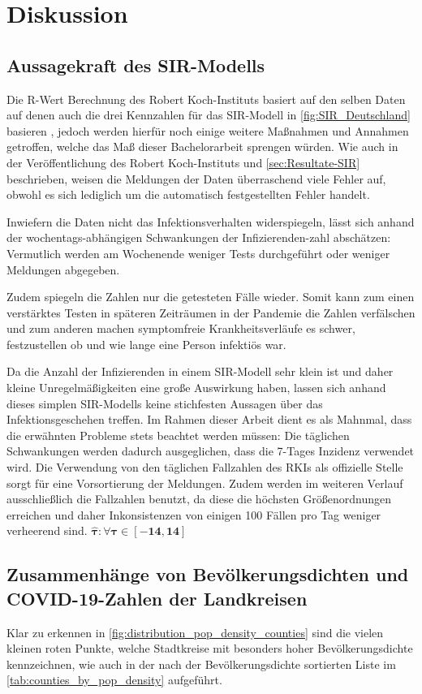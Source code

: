 \chapter{Diskussion}\label{chap:Diskussion}
\section{Aussagekraft des SIR-Modells}
Die R-Wert Berechnung des Robert Koch-Instituts basiert auf den selben Daten auf denen auch die drei Kennzahlen für das SIR-Modell in \autoref{fig:SIR_Deutschland} basieren \autocite{RKI_Bulletin}, jedoch werden hierfür noch einige weitere Maßnahmen und Annahmen getroffen, welche das Maß dieser Bachelorarbeit sprengen würden.\autocite{RKI_Bulletin}
Wie auch in der Veröffentlichung des Robert Koch-Instituts \autocite{RKI_Bulletin} und \autoref{sec:Resultate-SIR} beschrieben, weisen die Meldungen der Daten überraschend viele Fehler auf, obwohl es sich lediglich um die automatisch festgestellten Fehler handelt.

Inwiefern die Daten nicht das Infektionsverhalten widerspiegeln, lässt sich anhand der wochentags-abhängigen Schwankungen der Infizierenden-zahl abschätzen: Vermutlich werden am Wochenende weniger Tests durchgeführt oder weniger Meldungen abgegeben. 

Zudem spiegeln die Zahlen nur die getesteten Fälle wieder. Somit kann zum einen verstärktes Testen in späteren Zeiträumen in der Pandemie die Zahlen verfälschen und zum anderen machen symptomfreie Krankheitsverläufe es schwer, festzustellen ob und wie lange eine Person infektiös war.

Da die Anzahl der Infizierenden in einem SIR-Modell sehr klein ist und daher kleine Unregelmäßigkeiten eine große Auswirkung haben, lassen sich anhand dieses simplen SIR-Modells keine stichfesten Aussagen über das Infektionsgeschehen treffen.
Im Rahmen dieser Arbeit dient es als Mahnmal, dass die erwähnten Probleme stets beachtet werden müssen:
Die täglichen Schwankungen werden dadurch ausgeglichen, dass die 7-Tages Inzidenz verwendet wird. Die Verwendung von den täglichen Fallzahlen des RKIs als offizielle Stelle sorgt für eine Vorsortierung der Meldungen. Zudem werden im weiteren Verlauf ausschließlich die Fallzahlen benutzt, da diese die höchsten Größenordnungen erreichen und daher Inkonsistenzen von einigen 100 Fällen pro Tag weniger verheerend sind.
$\boldsymbol{\hat{\tau}:\forall\tau\in[-14, 14]}$

\section{Zusammenhänge von Bevölkerungsdichten und COVID-19-Zahlen der Landkreisen}\label{sec:discussion:pop_density_counties}
Klar zu erkennen in \autoref{fig:distribution_pop_density_counties} sind die vielen kleinen roten Punkte, welche Stadtkreise mit besonders hoher Bevölkerungsdichte kennzeichnen, wie auch in der nach der Bevölkerungsdichte sortierten Liste im \autoref{tab:counties_by_pop_density} aufgeführt.

